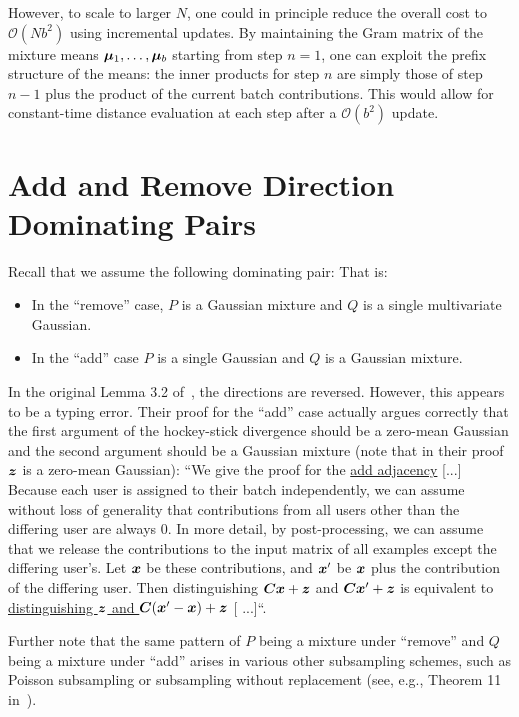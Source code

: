 However, to scale to larger $N$, one could in principle reduce the overall cost to $\mathcal{O}(N b^2)$ using incremental updates. By maintaining the Gram matrix of the mixture means ${\bm{\mu}}_1,\dots,{\bm{\mu}}_b$ starting from step $n=1$, one can exploit the prefix structure of the means: the inner products for step $n$ are simply those of step $n-1$ plus the product of the current batch contributions. This would allow for constant-time distance evaluation at each step after a $\mathcal{O}(b^2)$ update.

\clearpage

\section{Add and Remove Direction Dominating Pairs}\label{appendix:add_remove_flip}
Recall that we assume the following dominating pair:
\fulldominatingpair*
That is:
\begin{itemize}[nosep]
    \item In the ``remove'' case, $P$ is a Gaussian mixture and $Q$ is a single multivariate Gaussian.
    \item In the ``add'' case $P$ is a single Gaussian and $Q$ is a Gaussian mixture.
\end{itemize}
In the original Lemma 3.2 of~\cite{choquette2024near}, the directions are reversed. However, this appears to be a typing error.
Their proof for the ``add'' case actually argues correctly that the first argument of the hockey-stick divergence should be a zero-mean  Gaussian and the second argument should be a Gaussian mixture (note that in their proof ${\bm{z}}$ is a zero-mean Gaussian):
``We give the proof for the \underline{add adjacency} [...]
Because each user is assigned to their batch independently, we can assume without loss of generality that contributions from all users other than the differing user are always $0$. In more detail, by post-processing, we can assume that we release the contributions to the input matrix of all examples except the differing user's. Let ${\bm{x}}$ be these contributions, and ${\bm{x}}'$ be ${\bm{x}}$ plus the contribution of the differing user. Then distinguishing ${\bm{C}} {\bm{x}} + {\bm{z}}$ and ${\bm{C}} {\bm{x}}' + {\bm{z}}$ is equivalent to \underline{distinguishing ${\bm{z}}$ and ${\bm{C}} ({\bm{x}}' - {\bm{x}}) + {\bm{z}}$} [ ...]``.

Further note that the same pattern of $P$ being a mixture under ``remove'' and $Q$ being a mixture under ``add'' arises in various other subsampling schemes, such as Poisson subsampling or subsampling without replacement (see, e.g., Theorem 11 in~\cite{zhu2022optimal}).